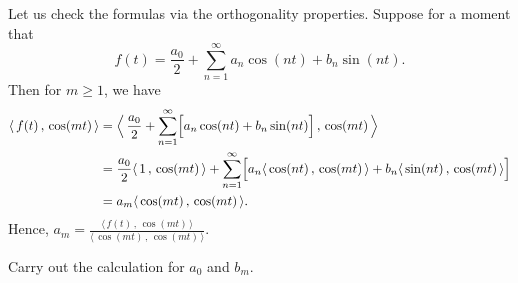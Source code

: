 Let us check the formulas via the orthogonality properties.  Suppose for
a moment that
\begin{equation*}
f(t) = \frac{a_0}{2} + \sum_{n=1}^\infty a_n \cos (n t) + b_n
\sin (n t) .
\end{equation*}
Then for $m \geq 1$, we have
\begin{equation*}
\begin{split}
\langle \, f(t)\,,\,\cos (mt) \, \rangle
& =
\Bigl\langle \, \frac{a_0}{2} + \sum_{n=1}^\infty
\Bigl[
a_n \cos (n t) + b_n \sin (n t)
\Bigr]
\,,\, \cos (mt) \, \Bigr\rangle \\
& =
\frac{a_0}{2}
\langle \, 1 \, , \, \cos (mt) \, \rangle
+
\sum_{n=1}^\infty
\Bigl[
a_n \langle \, \cos (nt) \, , \, \cos (mt) \, \rangle +
b_n \langle \, \sin (n t) \, , \, \cos (mt) \, \rangle
\Bigr]
\\
& =
a_m \langle \, \cos (mt) \, , \, \cos (mt) \, \rangle .
\end{split}
\end{equation*}
Hence,
$a_m =
\frac{\langle \, f(t) \, , \, \cos (mt) \, \rangle}{\langle \, \cos (mt) \, , \,
\cos (mt) \, \rangle}$.

\begin{exercise}
Carry out the calculation for $a_0$ and $b_m$.
\end{exercise}

